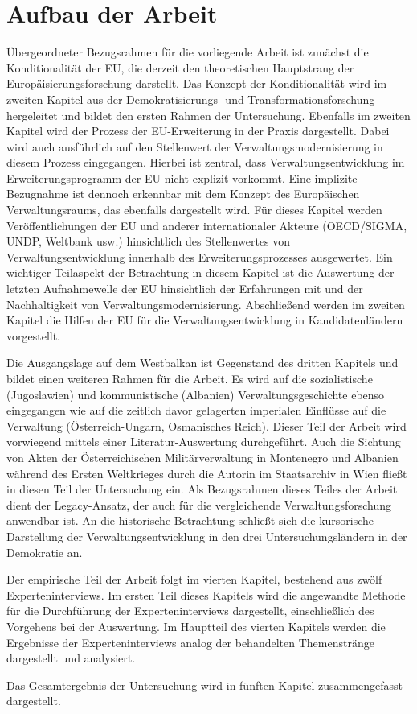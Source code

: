 \section{Aufbau der Arbeit }
Übergeordneter Bezugsrahmen für die vorliegende Arbeit ist zunächst die Konditionalität der EU, die derzeit den theoretischen Hauptstrang der Europäisierungsforschung darstellt. Das Konzept der Konditionalität wird im zweiten Kapitel aus der Demokratisierungs- und Transformationsforschung hergeleitet und bildet den ersten Rahmen der Untersuchung.
Ebenfalls im zweiten Kapitel wird der Prozess der EU-Erweiterung in der Praxis dargestellt. Dabei wird auch ausführlich auf den Stellenwert der Verwaltungsmodernisierung in diesem Prozess eingegangen. Hierbei ist zentral, dass Verwaltungsentwicklung im Erweiterungsprogramm der EU nicht explizit vorkommt. Eine implizite Bezugnahme ist dennoch erkennbar mit dem Konzept des Europäischen Verwaltungsraums, das ebenfalls dargestellt wird. Für dieses Kapitel werden Veröffentlichungen der EU und anderer internationaler Akteure (OECD/SIGMA, UNDP, Weltbank usw.) hinsichtlich des Stellenwertes von Verwaltungsentwicklung innerhalb des Erweiterungsprozesses ausgewertet. Ein wichtiger Teilaspekt der Betrachtung in diesem Kapitel ist die Auswertung der letzten Aufnahmewelle der EU hinsichtlich der Erfahrungen mit und der Nachhaltigkeit von Verwaltungsmodernisierung. Abschließend werden im zweiten Kapitel die Hilfen der EU für die Verwaltungsentwicklung in Kandidatenländern vorgestellt. \par
Die Ausgangslage auf dem Westbalkan ist Gegenstand des dritten Kapitels und bildet einen weiteren Rahmen für die Arbeit. Es wird auf die sozialistische (Jugoslawien) und kommunistische (Albanien) Verwaltungsgeschichte ebenso eingegangen wie auf die zeitlich davor gelagerten imperialen Einflüsse auf die Verwaltung (Österreich-Ungarn, Osmanisches Reich). Dieser Teil der Arbeit wird vorwiegend mittels einer Literatur-Auswertung durchgeführt. Auch die Sichtung von Akten der Österreichischen Militärverwaltung in Montenegro und Albanien während des Ersten Weltkrieges durch die Autorin im Staatsarchiv in Wien fließt in diesen Teil der Untersuchung ein. Als Bezugsrahmen dieses Teiles der Arbeit dient der Legacy-Ansatz, der auch für die vergleichende Verwaltungsforschung anwendbar ist. An die historische Betrachtung schließt sich die kursorische Darstellung der Verwaltungsentwicklung in den drei Untersuchungsländern in der Demokratie an.
\par
Der empirische Teil der Arbeit folgt im vierten Kapitel, bestehend aus zwölf Experteninterviews. Im ersten Teil dieses Kapitels wird die angewandte Methode für die Durchführung der Experteninterviews dargestellt, einschließlich des Vorgehens bei der Auswertung. Im Hauptteil des vierten Kapitels werden die Ergebnisse der Experteninterviews analog der behandelten Themenstränge dargestellt und analysiert.\par
Das Gesamtergebnis der Untersuchung wird in fünften Kapitel zusammengefasst dargestellt.